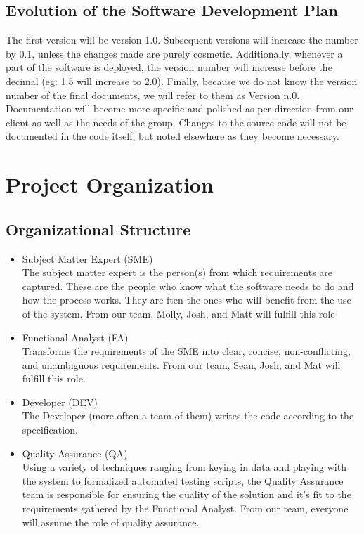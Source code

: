 \documentclass{article}
\begin{document}
\subsection{Evolution of the Software Development Plan}
The first version will be version 1.0. Subsequent versions will increase the number by 0.1, unless the changes made are purely cosmetic. Additionally, whenever a part of the software is deployed, the version number will increase before the decimal (eg: 1.5 will increase to 2.0). Finally, because we do not know the version number of the final documents, we will refer to them as Version n.0. Documentation will become more specific and polished as per direction from our client as well as the needs of the group. Changes to the source code will not be documented in the code itself, but noted elsewhere as they become necessary.
\section{Project Organization}
\subsection{Organizational Structure}\label{organizational structures}
\begin{itemize}
\item Subject Matter Expert (SME)\\
The subject matter expert is the person(s) from which requirements are captured. These are the people who know what the software needs to do and how the process works. They are ften the ones who will benefit from the use of the system. From our team, Molly, Josh, and Matt will fulfill this role
\item Functional Analyst (FA)\\
Transforms the requirements of the SME into clear, concise, non-conflicting, and unambiguous requirements. From our team, Sean, Josh, and Mat will fulfill this role.
\item Developer (DEV)\\
The Developer (more often a team of them) writes the code according to the specification.
\item Quality Assurance (QA)\\
Using a variety of techniques ranging from keying in data and playing with the system to formalized automated testing scripts, the Quality Assurance team is responsible for ensuring the quality of the solution and it's fit to the requirements gathered by the Functional Analyst. From our team, everyone will assume the role of quality assurance.
\end{itemize}
\end{document}

